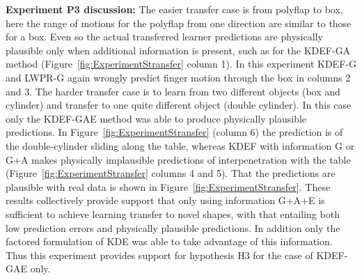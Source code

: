 {\bf Experiment P3 discussion:} 
The easier transfer case is from polyflap to box, here the range of
motions for the polyflap from one direction are similar to those for a
box. Even so the actual transferred learner predictions are physically
plausible only when additional information is present, such as for the
KDEF-GA method (Figure~\ref{fig:ExperimentStransfer} column 1). In
this experiment KDEF-G and LWPR-G again wrongly predict finger motion
through the box in columns 2 and 3. The harder transfer case is to
learn from two different objects (box and cylinder) and transfer to
one quite different object (double cylinder). In this case only the
KDEF-GAE method was able to produce physically plausible
predictions. In Figure~\ref{fig:ExperimentStransfer} (column 6) the
prediction is of the double-cylinder sliding along the table, whereas
KDEF with information G or G+A makes physically implausible
predictions of interpenetration with the table
(Figure~\ref{fig:ExperimentStransfer} columns 4 and 5). That the
predictions are plausible with real data is shown in
Figure~\ref{fig:ExperimentStransfer}. These results collectively
provide support that only using information G+A+E is sufficient to
achieve learning transfer to novel shapes, with that entailing both
low prediction errors and physically plausible predictions. In
addition only the factored formulation of KDE was able to take
advantage of this information. Thus this experiment provides support
for hypothesis H3 for the case of KDEF-GAE only.









